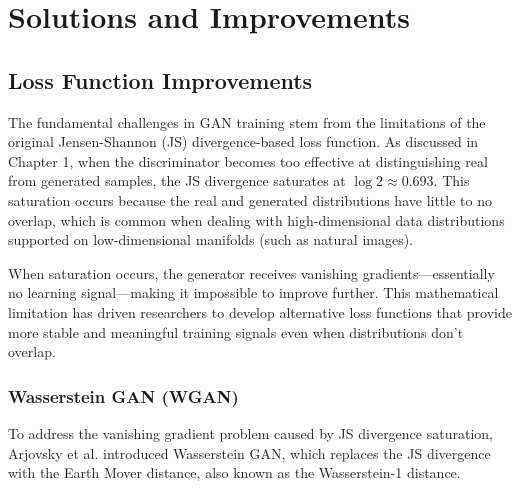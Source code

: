 \chapter{Solutions and Improvements}
\stopcontents[chapters]
\startcontents[chapters]
\fancyhead[LE]{\textsc{\chaptername~\thechapter}}

\section{Loss Function Improvements}

The fundamental challenges in GAN training stem from the limitations of the original Jensen-Shannon (JS) divergence-based loss function. As discussed in Chapter 1, when the discriminator becomes too effective at distinguishing real from generated samples, the JS divergence saturates at $\log 2 \approx 0.693$. This saturation occurs because the real and generated distributions have little to no overlap, which is common when dealing with high-dimensional data distributions supported on low-dimensional manifolds (such as natural images).

When saturation occurs, the generator receives vanishing gradients—essentially no learning signal—making it impossible to improve further. This mathematical limitation has driven researchers to develop alternative loss functions that provide more stable and meaningful training signals even when distributions don't overlap.

\subsection{Wasserstein GAN (WGAN)}

To address the vanishing gradient problem caused by JS divergence saturation, Arjovsky et al. \cite{ref2} introduced Wasserstein GAN, which replaces the JS divergence with the Earth Mover distance, also known as the Wasserstein-1 distance.

